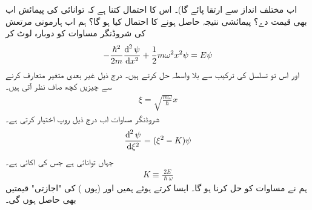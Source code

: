 اب مختلف انداز سے  ارتقا پائے گا)۔ اس کا احتمال کتنا ہے کہ توانائی کی پیمائش اب بھی   قیمت دے؟  پیمائشی نتیجہ  حاصل ہونے کا احتمال کیا ہو گا؟
ہم اب ہارمونی مرتعش کی شروڈنگر مساوات کو دوبارہ لوٹ کر
\begin{align}\label{مساوات_شروڈنگر_تحلیلی_حل_الف}
-\frac{\hslash^{2}}{2m}\frac{\dif^{\,2}\psi}{\dif x^{2}}+\frac{1}{2}m\omega^{2}x^{2}\psi=E\psi
\end{align}
اور اس تو تسلسل کی ترکیب سے بلا واسطہ  حل کرتے ہیں۔ درج ذیل غیر بعدی متغیر متعارف کرنے سے چیزیں کچھ صاف نظر آتی ہیں۔
\begin{align}
\xi=\sqrt{\frac{m\omega}{\hslash}}x
\end{align}
شروڈنگر مساوات اب درج ذیل روپ اختیار کرتی ہے۔
\begin{align}\label{مساوات_شروڈنگر_تحلیلی_شروڈنگر}
\frac{\dif^{\,2}\psi}{\dif \xi^{2}}=(\xi^{2}-K)\psi
\end{align}
جہاں  توانائی ہے جس کی اکائی  ہے۔
\begin{align}\label{مساوات_شروڈنگر_تحلیلی_مستقل}
K\equiv \frac{2E}{\hslash\omega}
\end{align}
ہم نے مساوات  کو حل کرنا ہو گا۔ ایسا کرتے ہوئے ہمیں  اور (یوں )  کی "اجازتی" قیمتیں بھی حاصل ہوں گی۔ 

